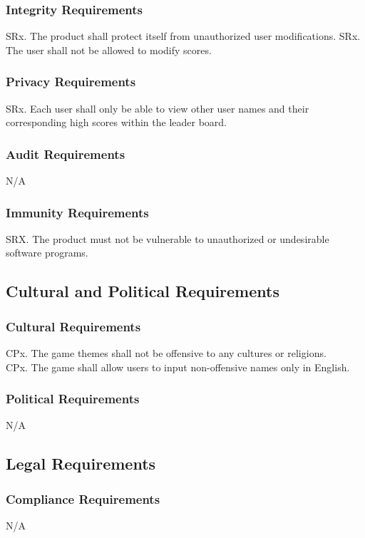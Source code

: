 \documentclass{article}
\begin{document}
    \subsubsection{Integrity Requirements}
    SRx. The product shall protect itself from unauthorized user modifications.
    SRx. The user shall not be allowed to modify scores.
    
    \subsubsection{Privacy Requirements}
    SRx. Each user shall only be able to view other user names and their corresponding high scores within the leader board.
    
    \subsubsection{Audit Requirements}
    N/A
    
    \subsubsection{Immunity Requirements}
    SRX. The product must not be vulnerable to unauthorized or undesirable software programs.
    
\subsection{Cultural and Political Requirements}
    \subsubsection{Cultural Requirements}
    CPx. The game themes shall not be offensive to any cultures or religions. \\
    CPx. The game shall allow users to input non-offensive names only in English.

    \subsubsection{Political Requirements}    N/A
    
\subsection{Legal Requirements}
    \subsubsection{Compliance Requirements}
    N/A
    
\end{document}
